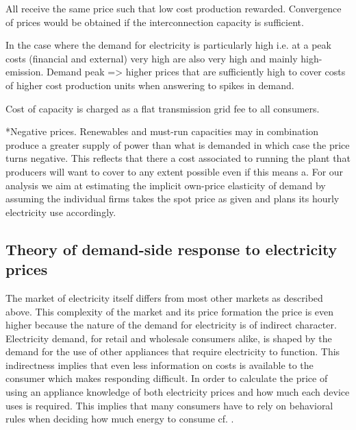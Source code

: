 All receive the same price such that low cost production rewarded. Convergence of prices would be obtained if the interconnection capacity is sufficient.

In the case where the demand for electricity is particularly high i.e. at a peak costs (financial and external) very high are also very high and mainly high-emission. Demand peak => higher prices that are sufficiently high to cover costs of higher cost production units
when answering to spikes in demand.

Cost of capacity is charged as a flat transmission grid fee to all consumers.

*Negative prices. Renewables and must-run capacities may in combination produce a greater supply of power than what is demanded in which case the price turns negative. This reflects that there a cost associated to running the plant that producers will want to cover to any extent possible even if this means a.
For our analysis we aim at estimating the implicit own-price elasticity of demand by assuming the individual firms takes the spot price as given and plans its hourly electricity use accordingly.
\smallskip \\


\subsection{Theory of demand-side response to electricity prices}
\label{subsec:t_demand}
The market of electricity itself differs from most other markets as described above. This complexity of the market and its price formation the price is even higher because the nature of the demand for electricity is of indirect character. Electricity demand, for retail and wholesale consumers alike, is shaped by the demand for the use of other appliances that require electricity to function.
This indirectness implies that even less information on costs is available to the consumer which makes responding difficult. In order to calculate the price of using an appliance knowledge of both electricity prices and how much each device uses is required. This implies that many consumers have to rely on behavioral rules when deciding how much energy to consume cf. \citep{kirschen2003demand}.


